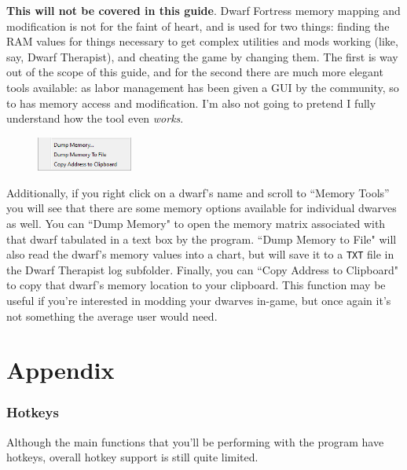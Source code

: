 \documentclass[]{article}
\begin{document}
\textbf{This will not be covered in this guide}. Dwarf Fortress memory mapping and modification is not
for the faint of heart, and is used for two things: finding the RAM values for things necessary to get
complex utilities and mods working (like, say, Dwarf Therapist), and cheating the game by changing them.
The first is way out of the scope of this guide, and for the second there are much more elegant tools
available: as labor management has been given a GUI by the community, so to has memory access and
modification. I'm also not going to pretend I fully understand how the tool even \emph{works}.
\begin{figure}
\vspace{-20pt}
  \begin{center}
    \includegraphics[width=0.28\textwidth]{Sec4FigExtra3}
  \end{center}
\vspace{-15pt}
\end{figure}

Additionally, if you right click on a dwarf's name and scroll to ``Memory Tools'' you will see that there
are some memory options available for individual dwarves as well. You can ``Dump Memory" to open the
memory matrix associated with that dwarf tabulated in a text box by the program. ``Dump Memory to File"
will also read the dwarf's memory values into a chart, but will save it to a \texttt{TXT} file in the
Dwarf Therapist log subfolder. Finally, you can ``Copy Address to Clipboard" to copy that dwarf's memory
location to your clipboard. This function may be useful if you're interested in modding your dwarves
in-game, but once again it's not something the average user would need.
\vfill \newpage
\part{Appendix}
\section{Hotkeys}
\label{sec:Hotkeys}

Although the main functions that you'll be performing with the program have hotkeys, overall hotkey
support is still quite limited.
\vspace{12pt}
\end{document}

